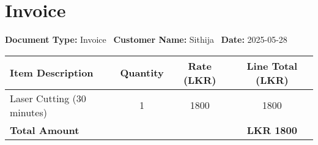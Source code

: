 \documentclass[a4paper]{article}
\begin{document}
    \section*{Invoice}
    \textbf{Document Type:} Invoice \
    \textbf{Customer Name:} Sithija \
    \textbf{Date:} 2025-05-28 \

    \begin{longtable}{|l|c|c|c|}
    \hline
    \textbf{Item Description} & \textbf{Quantity} & \textbf{Rate (LKR)} & \textbf{Line Total (LKR)} \\
    \hline
    Laser Cutting (30 minutes) & 1 & 1800 & 1800 \\ \hline
    \hline
    \textbf{Total Amount} & & & \textbf{LKR 1800} \\
    \hline
    \end{longtable}

    
\end{document}
